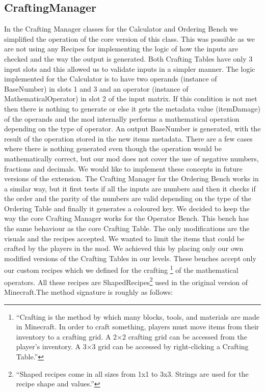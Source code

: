 \subsection{CraftingManager}
In the Crafting Manager classes for the Calculator and Ordering Bench we simplified the operation of the core version of this class. This was possible as we are not using any Recipes for implementing the logic of how the inputs are checked and the way the output is generated. Both Crafting Tables have only 3 input slots and this allowed us to validate inputs in a simpler manner.\newline\newline
The logic implemented for the Calculator is to have two operands (instance of BaseNumber) in slots 1 and 3 and an operator (instance of MathematicalOperator) in slot 2 of the input matrix. If this condition is not met then there is nothing to generate or else it gets the metadata value (itemDamage) of the operands and the mod internally performs a mathematical operation depending on the type of operator. An output BaseNumber is generated, with the result of the operation stored in the new items metadata. There are a few cases where there is nothing generated even though the operation would be mathematically correct, but our mod does not cover the use of negative numbers, fractions and decimals. We would like to implement these concepts in future versions of the extension.\newline\newline
The Crafting Manager for the Ordering Bench works in a similar way, but it first tests if all the inputs are numbers and then it checks if the order and the parity of the numbers are valid depending on the type of the Ordering Table and finally it generates a coloured key.\newline\newline
We decided to keep the way the core Crafting Manager works for the Operator Bench. This bench has the same behaviour as the core Crafting Table. The only modifications are the visuals and the recipes accepted. We wanted to limit the items that could be crafted by the players in the mod. We achieved this by placing only our own modified versions of the Crafting Tables in our levels. These benches accept only our custom recipes which we defined for the crafting \footnote{``Crafting is the method by which many blocks, tools, and materials are made in Minecraft. In order to craft something, players must move items from their inventory to a crafting grid. A 2×2 crafting grid can be accessed from the player's inventory. A 3×3 grid can be accessed by right-clicking a Crafting Table.''} of the mathematical operators. All these recipes are ShapedRecipes\footnote{``Shaped recipes come in all sizes from 1x1 to 3x3. Strings are used for the recipe shape and values.''\cite{website:forge-shaped}} used in the original version of Minecraft.\newline The method signature is roughly as follows:

